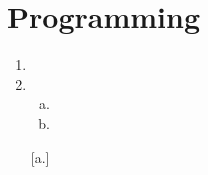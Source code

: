 \documentclass{article}
\begin{document}
\section{Programming}
\begin{enumerate}[1.]
\setcounter{enumi}[14]
\item \begin{enmerate}[a.]
      \item
      \item
      \end{enmerate}
\item \begin{enumerate}[a.]
      \item
      \item
      \end{enumerate}[a.]
\end{enumerate}
\end{document}
